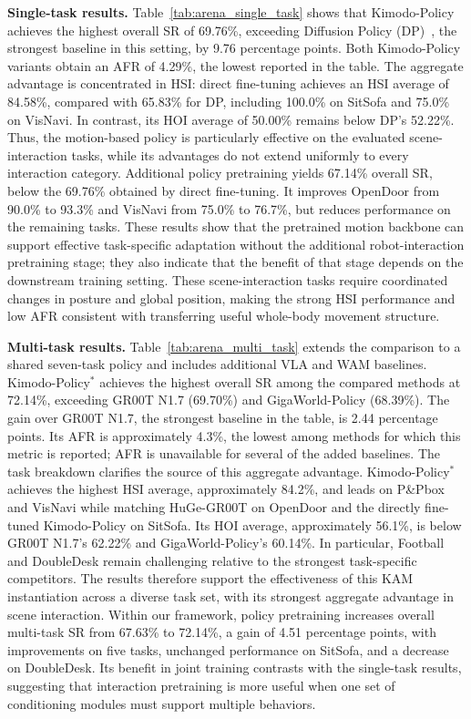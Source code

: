 \textbf{Single-task results.} Table~\ref{tab:arena_single_task} shows that Kimodo-Policy achieves the highest overall SR of 69.76\%, exceeding Diffusion Policy (DP)~\citep{chi2023diffusionpolicy}, the strongest baseline in this setting, by 9.76 percentage points. Both Kimodo-Policy variants obtain an AFR of 4.29\%, the lowest reported in the table. The aggregate advantage is concentrated in HSI: direct fine-tuning achieves an HSI average of 84.58\%, compared with 65.83\% for DP, including 100.0\% on SitSofa and 75.0\% on VisNavi. In contrast, its HOI average of 50.00\% remains below DP's 52.22\%. Thus, the motion-based policy is particularly effective on the evaluated scene-interaction tasks, while its advantages do not extend uniformly to every interaction category. Additional policy pretraining yields 67.14\% overall SR, below the 69.76\% obtained by direct fine-tuning. It improves OpenDoor from 90.0\% to 93.3\% and VisNavi from 75.0\% to 76.7\%, but reduces performance on the remaining tasks. These results show that the pretrained motion backbone can support effective task-specific adaptation without the additional robot-interaction pretraining stage; they also indicate that the benefit of that stage depends on the downstream training setting. These scene-interaction tasks require coordinated changes in posture and global position, making the strong HSI performance and low AFR consistent with transferring useful whole-body movement structure.



\textbf{Multi-task results.} Table~\ref{tab:arena_multi_task} extends the comparison to a shared seven-task policy and includes additional VLA and WAM baselines. Kimodo-Policy$^{*}$ achieves the highest overall SR among the compared methods at 72.14\%, exceeding GR00T N1.7 (69.70\%) and GigaWorld-Policy (68.39\%). The gain over GR00T N1.7, the strongest baseline in the table, is 2.44 percentage points. Its AFR is approximately 4.3\%, the lowest among methods for which this metric is reported; AFR is unavailable for several of the added baselines. The task breakdown clarifies the source of this aggregate advantage. Kimodo-Policy$^{*}$ achieves the highest HSI average, approximately 84.2\%, and leads on P\&Pbox and VisNavi while matching HuGe-GR00T on OpenDoor and the directly fine-tuned Kimodo-Policy on SitSofa. Its HOI average, approximately 56.1\%, is below GR00T N1.7's 62.22\% and GigaWorld-Policy's 60.14\%. In particular, Football and DoubleDesk remain challenging relative to the strongest task-specific competitors. The results therefore support the effectiveness of this KAM instantiation across a diverse task set, with its strongest aggregate advantage in scene interaction. Within our framework, policy pretraining increases overall multi-task SR from 67.63\% to 72.14\%, a gain of 4.51 percentage points, with improvements on five tasks, unchanged performance on SitSofa, and a decrease on DoubleDesk. Its benefit in joint training contrasts with the single-task results, suggesting that interaction pretraining is more useful when one set of conditioning modules must support multiple behaviors.

